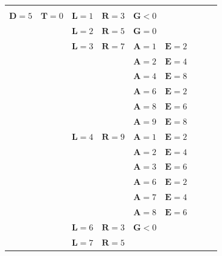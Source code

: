 \begin{figure} %


\begin{center}


{\small


\begin{tabular}{|ccccccccc|}


\hline


&&&&&&&&\\[-9pt]


$\mathbf{D}=5$ & $\mathbf{T}=0$ & $\mathbf{L}=1$ & $\mathbf{R}=3$& $\mathbf{G}<0$ & &&&\\


&&$\mathbf{L}=2$ & $\mathbf{R}=5$ & $\mathbf{G}=0$ &&&&\\


&&$\mathbf{L}=3$& $\mathbf{R}=7$ & $\mathbf{A}=1$ & $\mathbf{E}=2$ &&&\\


&&&&$\mathbf{A}=2$ & $\mathbf{E}=4$ &&&\\


&&&&$\mathbf{A}=4$ & $\mathbf{E}=8$ &&&\\


&&&&$\mathbf{A}=6$ & $\mathbf{E}=2$ &&&\\


&&&&$\mathbf{A}=8$ & $\mathbf{E}=6$ &&&\\


&&&&$\mathbf{A}=9$ & $\mathbf{E}=8$ &&&\\


&& $\mathbf{L}=4$ & $\mathbf{R}=9$ & $\mathbf{A}=1$& $\mathbf{E}=2$& &&\\


&&&&$\mathbf{A}=2$ & $\mathbf{E}=4$ &&&\\


&&&&$\mathbf{A}=3$ & $\mathbf{E}=6$ &&&\\


&&&&$\mathbf{A}=6$ & $\mathbf{E}=2$ &&&\\


&&&&$\mathbf{A}=7$ & $\mathbf{E}=4$ &&&\\


&&&&$\mathbf{A}=8$ & $\mathbf{E}=6$ &&&\\


&&$\mathbf{L}=6$& $\mathbf{R}=3$ & $\mathbf{G}<0$&&&&\\


&& $\mathbf{L}=7$ & $\mathbf{R}=5$ &&&&&\\



\end{tabular}}
\end{center}
\end{figure}
